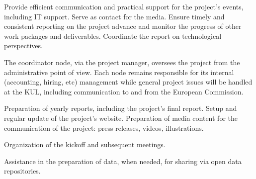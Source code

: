 \begin{workpackage}[id=management,type=MGT,wphases=0-48!.2,
  title=Project Management,short=Management,
  lead=KUL,KULRM=24]

\begin{mdframed}
\mobjectives
%
Provide efficient communication and practical support for the project's events,
including IT support.
%
Serve as contact for the media.
%
Ensure timely and consistent reporting on the project advance and monitor the
progress of other work packages and deliverables.
%
Coordinate the report on technological perspectives.

\mdescription
%
The coordinator node, via the project manager, oversees the project from the
administrative point of view. Each node remains responsible for its internal
(accounting, hiring, etc) management while general project issues will be
handled at the KUL, including communication to and from the European Commission.
\end{mdframed}

\begin{tasklist}
\begin{task}[title=Communication,id=mgt-comm,lead=KUL,PM=6,wphases=0-48!0.3]
Preparation of yearly reports, including the project's final report.
%
Setup and regular update of the project's website.
%
Preparation of media content for the communication of the project: press
releases, videos, illustrations.
\end{task}
\begin{task}[title=Meetings,id=mgt-meetings,lead=KUL,PM=6,wphases=0-48!0.15]
Organization of the kickoff and subsequent meetings.
\end{task}
\begin{task}[title=IT,id=mgt-IT,lead=KUL,PM=6,wphases=0-48!0.05]
Assistance in the preparation of data, when needed, for sharing via open data repositories.
\end{task}
\end{tasklist}


\end{workpackage}
